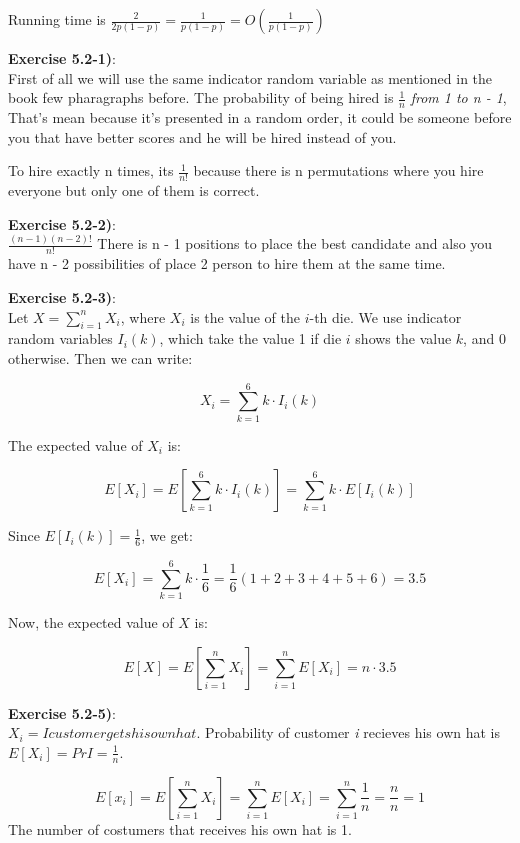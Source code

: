\documentclass{article}
\newcounter{exercise}[section]   %
\begin{document}
Running time is \(\frac{2}{2p(1 - p)} = \frac{1}{p(1 - p)} = O\left(\frac{1}{p(1 - p)}\right)\)

\textbf{Exercise 5.2-1)}:\\
First of all we will use the same indicator random variable as mentioned in the book few 
pharagraphs before. The probability of being hired is \(\frac{1}{n}\) \textit{from 1 to n - 1},
That's mean because it's presented in a random order, it could be someone before you that
have better scores and he will be hired instead of you. 

To hire exactly n times, its \(\frac{1}{n!}\) because there is n permutations where you hire
everyone but only one of them is correct.

\textbf{Exercise 5.2-2)}:\\
\(\frac{(n - 1)(n - 2)!}{n!}\) There is n - 1 positions to place the best candidate and
also you have n - 2 possibilities of place 2 person to hire them at the same time.

\textbf{Exercise 5.2-3)}:\\
Let \( X = \sum_{i=1}^{n} X_i \), where \( X_i \) is the value of the \( i \)-th die. We use indicator random variables \( I_i(k) \), which take the value 1 if die \( i \) shows the value \( k \), and 0 otherwise. Then we can write:

\[
X_i = \sum_{k=1}^{6} k \cdot I_i(k)
\]

The expected value of \( X_i \) is:

\[
E[X_i] = E\left[ \sum_{k=1}^{6} k \cdot I_i(k) \right] = \sum_{k=1}^{6} k \cdot E[I_i(k)]
\]

Since \( E[I_i(k)] = \frac{1}{6} \), we get:

\[
E[X_i] = \sum_{k=1}^{6} k \cdot \frac{1}{6} = \frac{1}{6} (1 + 2 + 3 + 4 + 5 + 6) = 3.5
\]

Now, the expected value of \( X \) is:

\[
E[X] = E\left[ \sum_{i=1}^{n} X_i \right] = \sum_{i=1}^{n} E[X_i] = n \cdot 3.5
\]

\textbf{Exercise 5.2-5)}:\\
\(X_i = I{customer gets his own hat}\). Probability of customer \textit{i} recieves his 
own hat is \(E[X_i] = Pr{I} = \frac{1}{n}\).

\[
E[x_i] = E \left[\sum_{i = 1}^{n} X_i\right] = \sum_{i = 1}^{n} E[X_i] = \sum_{i = 1}^{n} 
\frac{1}{n} = \frac{n}{n} = 1
\]
The number of costumers that receives his own hat is 1.
\end{document}
